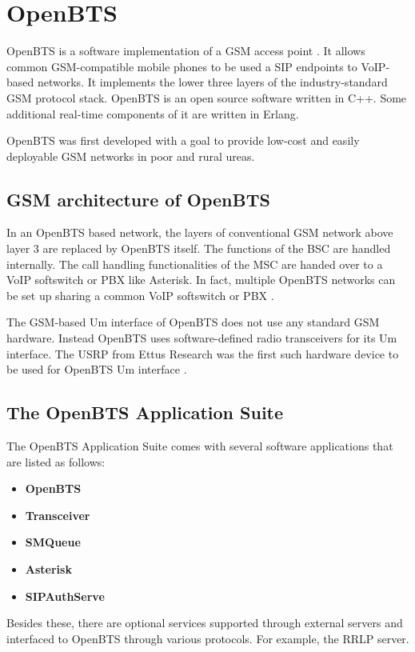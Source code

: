 \chapter{OpenBTS}

OpenBTS is a software implementation of a GSM access point \cite{wikiOpenBTS}.
It allows common GSM-compatible mobile phones to be used a SIP endpoints to VoIP-based
networks. It implements the lower three layers of the industry-standard GSM
protocol stack. OpenBTS is an open source software written in C++. Some 
additional real-time components of it are written in Erlang.

OpenBTS was first developed with a goal to provide low-cost and easily 
deployable GSM networks in poor and rural ureas.

\section{GSM architecture of OpenBTS}
In an OpenBTS based network, the layers of conventional GSM network above layer 3
are replaced by OpenBTS itself. The functions of the BSC are handled internally.
The call handling functionalities of the MSC are handed over to a VoIP 
softswitch or PBX like Asterisk. In fact, multiple OpenBTS networks 
can be set up sharing a common VoIP softswitch or PBX \cite{wikiOpenBTS}.

The GSM-based Um interface of OpenBTS 
does not use any standard GSM hardware. Instead OpenBTS uses software-defined
radio transceivers for its Um interface. The USRP from Ettus Research was the
first such hardware device to be used for OpenBTS Um interface \cite{wikiOpenBTS}.



\section{The OpenBTS Application Suite}
The OpenBTS Application Suite comes with several software applications that 
are listed as follows:

\begin{itemize}
\item \textbf{OpenBTS}
\item \textbf{Transceiver}
\item \textbf{SMQueue}
\item \textbf{Asterisk}
\item \textbf{SIPAuthServe}
\end{itemize}

Besides these, there are optional services supported through 
external servers and interfaced to OpenBTS through various protocols. For 
example, the RRLP server.

